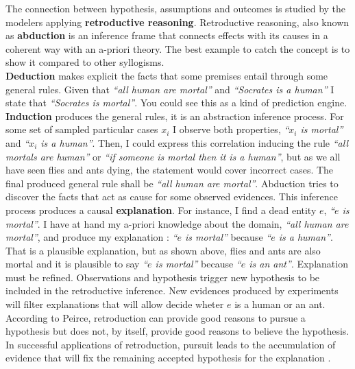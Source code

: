 \documentclass[11pt,oneside,a4paper,openright]{report}
\begin{document}
The connection between hypothesis, assumptions and outcomes is studied by the modelers applying \textbf{retroductive reasoning}\cite{Premo2010_pg34}. Retroductive reasoning, also known as \textbf{abduction} is an inference frame that connects effects with its causes in a coherent way with an a-priori theory. The best example to catch the concept is to show it compared to other syllogisms.\\ \textbf{Deduction} makes explicit the facts that some premises entail through some general rules. Given that \textit{``all human are mortal''} and \textit{``Socrates is a human''} I state that \textit{``Socrates is mortal''}. You could see this as a kind of prediction engine. \textbf{Induction} produces the general rules, it is an abstraction inference process. For some set of sampled particular cases $x_i$ I observe both properties, \textit{``$x_i$ is mortal''} and \textit{``$x_i$ is a human''}. Then, I could express this correlation inducing the rule \textit{``all mortals are human''} or \textit{``if someone is mortal then it is a human''}, but as we all have seen flies and ants dying, the statement would cover incorrect cases. The final produced general rule shall be \textit{``all human are mortal''}. Abduction tries to discover the facts that act as cause for some observed evidences. This inference process produces a causal \textbf{explanation}. For instance, I find a dead entity $e$, \textit{``$e$ is mortal''}. I have at hand my a-priori knowledge about the domain, \textit{``all human are mortal''}, and produce my explanation : \textit{``$e$ is mortal''} because \textit{``$e$ is a human''}. That is a plausible explanation, but as shown above, flies and ants are also mortal and it is plausible to say \textit{``$e$ is mortal''} because \textit{``$e$ is an ant''}. Explanation must be refined. Observations and hypothesis trigger new hypothesis to be included in the retroductive inference. New evidences produced by experiments will filter explanations that will allow decide wheter $e$ is a human or an ant. According to Peirce, retroduction can provide good reasons to pursue a hypothesis but does not, by itself, provide good reasons to believe the hypothesis. In successful applications of retroduction, pursuit leads to the accumulation of evidence that will fix the remaining accepted hypothesis for the explanation \cite{Peirce_Abduction}.\\  
%
\end{document}
